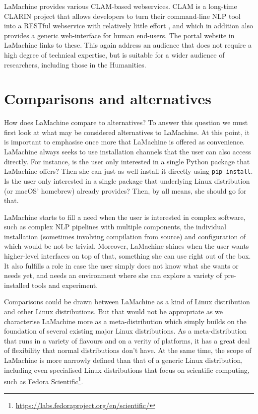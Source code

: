\documentclass[a4paper,11pt]{article}
\begin{document}
LaMachine provides various CLAM-based webservices. CLAM is a long-time CLARIN project that allows developers to turn
their command-line NLP tool into a RESTful webservice with relatively little effort \cite{CLAMPAPER}, and which in
addition also provides a generic web-interface for human end-users. The portal website in LaMachine links to these. This
again address an audience that does not require a high degree of technical expertise, but is suitable for a wider
audience of researchers, including those in the Humanities.

\section{Comparisons and alternatives}
\label{sec:comparisons}

How does LaMachine compare to alternatives? To answer this question we must first look at what may be considered
alternatives to LaMachine. At this point, it is important to emphasise once more that LaMachine is offered as convenience.
LaMachine always seeks to use installation channels that the user can also access directly. For instance, is the user
only interested in a single Python package that LaMachine offers? Then she can just as well install it directly using
\texttt{pip install}. Is the user only interested in a single package that underlying Linux distribution (or macOS' homebrew)
already provides? Then, by all means, she should go for that.

LaMachine starts to fill a need when the user is interested in complex software, such as complex NLP pipelines with
multiple components, the individual installation (sometimes involving compilation from source) and configuration of
which would be not be trivial. Moreover, LaMachine shines when the user wants higher-level interfaces on top of that,
something she can use right out of the box. It also fulfills a role in case the user simply does not know what she wants
or needs yet, and needs an environment where she can explore a variety of pre-installed tools and experiment.

Comparisons could be drawn between LaMachine as a kind of Linux distribution and other Linux distributions. But that
would not be appropriate as we characterise LaMachine more as a meta-distribution which simply builds on the foundation
of several existing major Linux distributions. As a meta-distribution that runs in a variety of flavours and on a verity
of platforms, it has a great deal of flexibility that normal distributions don't have. At the same time, the scope of
LaMachine is more narrowly defined than that of a generic Linux distribution, including even specialised Linux
distributions that focus on scientific computing, such as Fedora
Scientific\footnote{\url{https://labs.fedoraproject.org/en/scientific/}}.
\end{document}
